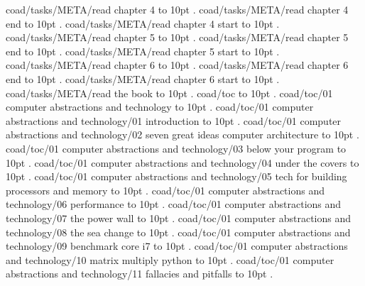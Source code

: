 \smallskip
coad/tasks/META/read chapter 4 \leaders\hbox to 10pt {\hss.\hss}  \hfill {}
\smallskip
coad/tasks/META/read chapter 4 end \leaders\hbox to 10pt {\hss.\hss}  \hfill {}
\smallskip
coad/tasks/META/read chapter 4 start \leaders\hbox to 10pt {\hss.\hss}  \hfill {}
\smallskip
coad/tasks/META/read chapter 5 \leaders\hbox to 10pt {\hss.\hss}  \hfill {}
\smallskip
coad/tasks/META/read chapter 5 end \leaders\hbox to 10pt {\hss.\hss}  \hfill {}
\smallskip
coad/tasks/META/read chapter 5 start \leaders\hbox to 10pt {\hss.\hss}  \hfill {}
\smallskip
coad/tasks/META/read chapter 6 \leaders\hbox to 10pt {\hss.\hss}  \hfill {}
\smallskip
coad/tasks/META/read chapter 6 end \leaders\hbox to 10pt {\hss.\hss}  \hfill {}
\smallskip
coad/tasks/META/read chapter 6 start \leaders\hbox to 10pt {\hss.\hss}  \hfill {}
\smallskip
coad/tasks/META/read the book \leaders\hbox to 10pt {\hss.\hss}  \hfill {}
\smallskip
coad/toc \leaders\hbox to 10pt {\hss.\hss}  \hfill {}
\smallskip
coad/toc/01 computer abstractions and technology \leaders\hbox to 10pt {\hss.\hss}  \hfill {}
\smallskip
coad/toc/01 computer abstractions and technology/01 introduction \leaders\hbox to 10pt {\hss.\hss}  \hfill {}
\smallskip
coad/toc/01 computer abstractions and technology/02 seven great ideas computer architecture \leaders\hbox to 10pt {\hss.\hss}  \hfill {}
\smallskip
coad/toc/01 computer abstractions and technology/03 below your program \leaders\hbox to 10pt {\hss.\hss}  \hfill {}
\smallskip
coad/toc/01 computer abstractions and technology/04 under the covers \leaders\hbox to 10pt {\hss.\hss}  \hfill {}
\smallskip
coad/toc/01 computer abstractions and technology/05 tech for building processors and memory \leaders\hbox to 10pt {\hss.\hss}  \hfill {}
\smallskip
coad/toc/01 computer abstractions and technology/06 performance \leaders\hbox to 10pt {\hss.\hss}  \hfill {}
\smallskip
coad/toc/01 computer abstractions and technology/07 the power wall \leaders\hbox to 10pt {\hss.\hss}  \hfill {}
\smallskip
coad/toc/01 computer abstractions and technology/08 the sea change \leaders\hbox to 10pt {\hss.\hss}  \hfill {}
\smallskip
coad/toc/01 computer abstractions and technology/09 benchmark core i7 \leaders\hbox to 10pt {\hss.\hss}  \hfill {}
\smallskip
coad/toc/01 computer abstractions and technology/10 matrix multiply python \leaders\hbox to 10pt {\hss.\hss}  \hfill {}
\smallskip
coad/toc/01 computer abstractions and technology/11 fallacies and pitfalls \leaders\hbox to 10pt {\hss.\hss}  \hfill {}
